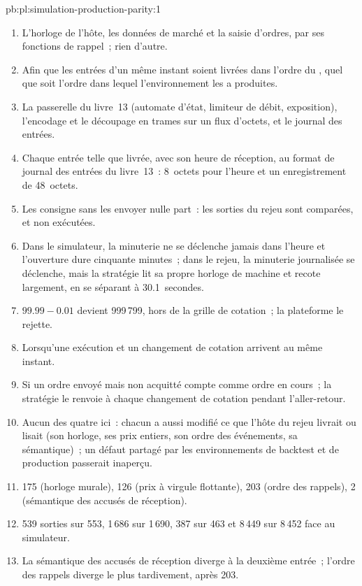 \begin{solution}{pb:pl:simulation-production-parity:1}
\begin{enumerate}
\item L'horloge de l'hôte, les données de marché et la saisie d'ordres, par ses fonctions de rappel~; rien d'autre.
\item Afin que les entrées d'un même instant soient livrées dans l'ordre du , quel que soit l'ordre dans lequel l'environnement les a produites.
\item La passerelle du livre~13 (automate d'état, limiteur de débit, exposition), l'encodage et le découpage en trames sur un flux d'octets, et le journal des entrées.
\item Chaque entrée telle que livrée, avec son heure de réception, au format de journal des entrées du livre~13~: 8~octets pour l'heure et un enregistrement de 48~octets.
\item Les consigne sans les envoyer nulle part~: les sorties du rejeu sont comparées, et non exécutées.
\item Dans le simulateur, la minuterie ne se déclenche jamais dans l'heure et l'ouverture dure cinquante minutes~; dans le rejeu, la minuterie journalisée se déclenche, mais la
stratégie lit sa propre horloge de machine et recote largement, en se séparant à 30.1~secondes.
\item $99.99 - 0.01$ devient 999\,799, hors de la grille de cotation~; la plateforme le rejette.
\item Lorsqu'une exécution et un changement de cotation arrivent au même instant.
\item Si un ordre envoyé mais non acquitté compte comme ordre en cours~; la stratégie le renvoie à chaque changement de cotation pendant l'aller-retour.
\item Aucun des quatre ici~: chacun a aussi modifié ce que l'hôte du rejeu livrait ou lisait (son horloge, ses prix entiers, son ordre des événements, sa
sémantique)~; un défaut partagé par les environnements de backtest et de production passerait inaperçu.
\item 175 (horloge murale), 126 (prix à virgule flottante), 203 (ordre des rappels), 2 (sémantique des accusés de réception).
\item 539 sorties sur 553, 1\,686 sur 1\,690, 387 sur 463 et 8\,449 sur 8\,452 face au simulateur.
\item La sémantique des accusés de réception diverge à la deuxième entrée~; l'ordre des rappels diverge le plus tardivement, après 203.

\end{enumerate}
\end{solution}
